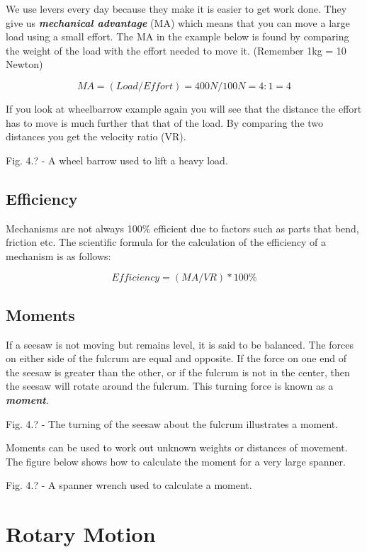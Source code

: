 \documentclass[
]{book}
\begin{document}
We use levers every day because they make it is easier to get work done. They give us \textbf{\emph{mechanical advantage}} (MA) which means that you can move a large load using a small effort. The MA in the example below is found by comparing the weight of the load with the effort needed to move it. (Remember 1kg = 10 Newton)

\[MA=(Load/Effort)=400N/100N=4:1 = 4\]

If you look at wheelbarrow example again you will see that the distance the effort has to move is much further that that of the load. By comparing the two distances you get the velocity ratio (VR).

Fig. 4.? - A wheel barrow used to lift a heavy load.

\hypertarget{efficiency}{%
\subsection{Efficiency}\label{efficiency}}

Mechanisms are not always 100\% efficient due to factors such as parts that bend, friction etc.
The scientific formula for the calculation of the efficiency of a mechanism is as follows:

\[Efficiency = (MA/VR)*100\%\]

\hypertarget{moments}{%
\subsection{Moments}\label{moments}}

If a seesaw is not moving but remains level, it is said to be balanced. The forces on either side of the fulcrum are equal and opposite. If the force on one end of the seesaw is greater than the other, or if the fulcrum is not in the center, then the seesaw will rotate around the fulcrum. This turning force is known as a \textbf{\emph{moment}}.

Fig. 4.? - The turning of the seesaw about the fulcrum illustrates a moment.

Moments can be used to work out unknown weights or distances of movement. The figure below shows how to calculate the moment for a very large spanner.

Fig. 4.? - A spanner wrench used to calculate a moment.

\hypertarget{rotary-motion}{%
\section{Rotary Motion}\label{rotary-motion}}
\end{document}
